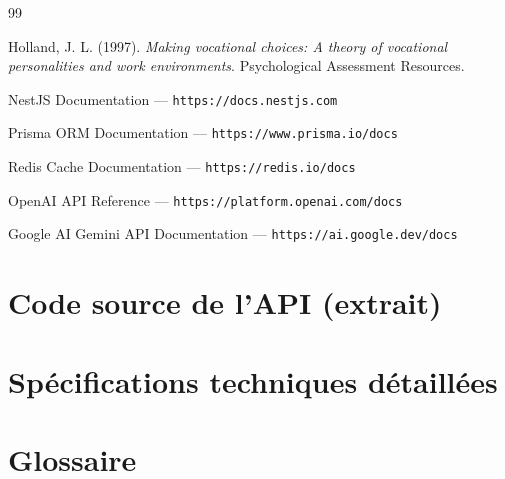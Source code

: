 \documentclass[12pt,a4paper]{report}
\begin{document}
\begin{thebibliography}{99}

 Holland, J. L. (1997). \textit{Making vocational choices: A theory of vocational personalities and work environments}. Psychological Assessment Resources.

 NestJS Documentation — \texttt{https://docs.nestjs.com}

 Prisma ORM Documentation — \texttt{https://www.prisma.io/docs}

 Redis Cache Documentation — \texttt{https://redis.io/docs}

 OpenAI API Reference — \texttt{https://platform.openai.com/docs}

 Google AI Gemini API Documentation — \texttt{https://ai.google.dev/docs}

\end{thebibliography}

\appendix
\chapter{Code source de l'API (extrait)}
\chapter{Spécifications techniques détaillées}
\chapter{Glossaire}
\end{document}
